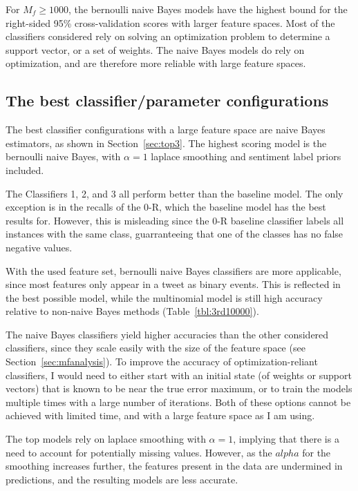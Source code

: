 \documentclass[11pt]{article}
\begin{document}
For $M_f \geq 1000$, the bernoulli naive Bayes models have the highest bound for the right-sided 95\% cross-validation scores with larger feature spaces.
Most of the classifiers considered rely on solving an optimization problem to determine a support vector, or a set of weights.
The naive Bayes models do rely on optimization, and are therefore more reliable with large feature spaces.

\subsection{The best classifier/parameter configurations}

The best classifier configurations with a large feature space are naive Bayes estimators, as shown in Section~\ref{sec:top3}.
The highest scoring model is the bernoulli naive Bayes, with $\alpha = 1$ laplace smoothing and sentiment label priors included.


The Classifiers 1, 2, and 3 all perform better than the baseline model. 
The only exception is in the recalls of the 0-R, which the baseline model has the best results for.
However, this is misleading since the 0-R baseline classifier labels all instances with the same class, 
guarranteeing that one of the classes has no false negative values.


With the used feature set, bernoulli naive Bayes classifiers are more applicable, since most features only appear in a tweet as binary events.
This is reflected in the best possible model, while the multinomial model is still high accuracy relative to non-naive Bayes methods (Table~\ref{tbl:3rd10000}).

\pagebreak
The naive Bayes classifiers yield higher accuracies than the other considered classifiers, since they scale easily with the size of the feature space (see Section~\ref{sec:mfanalysis}).
To improve the accuracy of optimization-reliant classifiers, I would need to either start with an initial state (of weights or support vectors) that is known to be near the true error maximum, 
or to train the models multiple times with a large number of iterations.
Both of these options cannot be achieved with limited time, and with a large feature space as I am using.


The top models rely on laplace smoothing with $\alpha = 1$, implying that there is a need to account for potentially missing values.
However, as the $alpha$ for the smoothing increases further, 
the features present in the data are undermined in predictions, and the resulting models are less accurate. 
\end{document}
